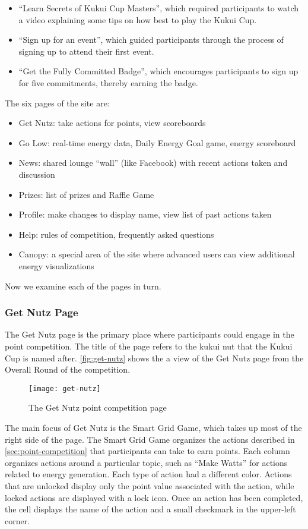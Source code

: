 \begin{itemize}
	\item ``Learn Secrets of Kukui Cup Masters'', which required participants to watch a video explaining some tips on how best to play the Kukui Cup.
	\item ``Sign up for an event'', which guided participants through the process of signing up to attend their first event.
	\item ``Get the Fully Committed Badge'', which encourages participants to sign up for five commitments, thereby earning the badge.
\end{itemize}

The six pages of the site are:
\begin{itemize}
	\item Get Nutz: take actions for points, view scoreboards
	\item Go Low: real-time energy data, Daily Energy Goal game, energy scoreboard
	\item News: shared lounge ``wall'' (like Facebook) with recent actions taken and discussion
	\item Prizes: list of prizes and Raffle Game
	\item Profile: make changes to display name, view list of past actions taken
	\item Help: rules of competition, frequently asked questions
	\item Canopy: a special area of the site where advanced users can view additional energy visualizations
\end{itemize}

Now we examine each of the pages in turn.


\subsubsection{Get Nutz Page}

The Get Nutz page is the primary place where participants could engage in the point competition. The title of the page refers to the kukui nut that the Kukui Cup is named after. \autoref{fig:get-nutz} shows the a view of the Get Nutz page from the Overall Round of the competition.

\begin{figure}[htbp]
	\centering
		\texttt{[image: get-nutz]}
		\caption{The Get Nutz point competition page}
\label{fig:get-nutz}
\end{figure}

The main focus of Get Nutz is the Smart Grid Game, which takes up most of the right side of the page. The Smart Grid Game organizes the actions described in \autoref{sec:point-competition} that participants can take to earn points. Each column organizes actions around a particular topic, such as ``Make Watts'' for actions related to energy generation. Each type of action had a different color. Actions that are unlocked display only the point value associated with the action, while locked actions are displayed with a lock icon. Once an action has been completed, the cell displays the name of the action and a small checkmark in the upper-left corner.

